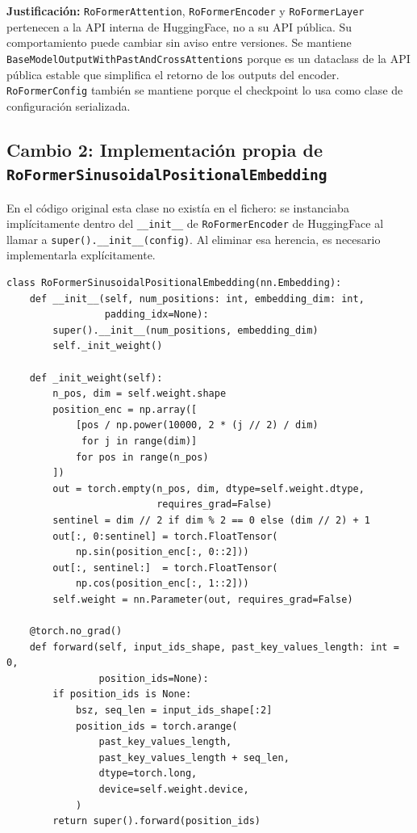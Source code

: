 \documentclass[12pt,a4paper]{article}
\begin{document}
\begin{notebox}
\textbf{Justificación:} \texttt{RoFormerAttention}, \texttt{RoFormerEncoder} y
\texttt{RoFormerLayer} pertenecen a la API interna de HuggingFace, no a su API pública.
Su comportamiento puede cambiar sin aviso entre versiones. Se mantiene
\texttt{BaseModelOutputWithPastAndCrossAttentions} porque es un dataclass de la API
pública estable que simplifica el retorno de los outputs del encoder. \texttt{RoFormerConfig}
también se mantiene porque el checkpoint lo usa como clase de configuración serializada.
\end{notebox}

\subsection{Cambio 2: Implementación propia de \texttt{RoFormerSinusoidalPositionalEmbedding}}

En el código original esta clase no existía en el fichero: se instanciaba implícitamente
dentro del \texttt{\_\_init\_\_} de \texttt{RoFormerEncoder} de HuggingFace al llamar a
\texttt{super().\_\_init\_\_(config)}. Al eliminar esa herencia, es necesario implementarla
explícitamente.

\begin{lstlisting}[caption={Implementación propia del embedding posicional sinusoidal}]
class RoFormerSinusoidalPositionalEmbedding(nn.Embedding):
    def __init__(self, num_positions: int, embedding_dim: int,
                 padding_idx=None):
        super().__init__(num_positions, embedding_dim)
        self._init_weight()

    def _init_weight(self):
        n_pos, dim = self.weight.shape
        position_enc = np.array([
            [pos / np.power(10000, 2 * (j // 2) / dim)
             for j in range(dim)]
            for pos in range(n_pos)
        ])
        out = torch.empty(n_pos, dim, dtype=self.weight.dtype,
                          requires_grad=False)
        sentinel = dim // 2 if dim % 2 == 0 else (dim // 2) + 1
        out[:, 0:sentinel] = torch.FloatTensor(
            np.sin(position_enc[:, 0::2]))
        out[:, sentinel:]  = torch.FloatTensor(
            np.cos(position_enc[:, 1::2]))
        self.weight = nn.Parameter(out, requires_grad=False)

    @torch.no_grad()
    def forward(self, input_ids_shape, past_key_values_length: int = 0,
                position_ids=None):
        if position_ids is None:
            bsz, seq_len = input_ids_shape[:2]
            position_ids = torch.arange(
                past_key_values_length,
                past_key_values_length + seq_len,
                dtype=torch.long,
                device=self.weight.device,
            )
        return super().forward(position_ids)
\end{lstlisting}
\end{document}

